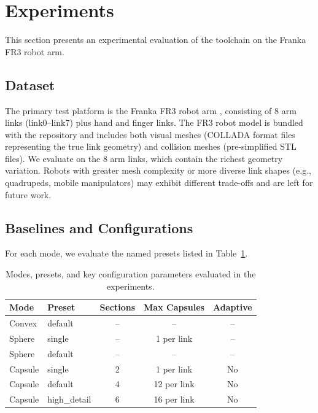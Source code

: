 \section{Experiments}
\label{sec:experiments}

This section presents an experimental evaluation of the toolchain on the Franka FR3 robot arm.

\subsection{Dataset}

The primary test platform is the Franka FR3 robot arm \cite{franka2020fr3}, consisting of 8 arm links (link0--link7) plus hand and finger links.
The FR3 robot model is bundled with the repository and includes both visual meshes (COLLADA format files representing the true link geometry) and collision meshes (pre-simplified STL files).
We evaluate on the 8 arm links, which contain the richest geometry variation.
Robots with greater mesh complexity or more diverse link shapes (e.g., quadrupeds, mobile manipulators) may exhibit different trade-offs and are left for future work.

\subsection{Baselines and Configurations}

For each mode, we evaluate the named presets listed in Table~\ref{tab:presets}.

\begin{table}[t]
\centering
\caption{Modes, presets, and key configuration parameters evaluated in the experiments.}
\label{tab:presets}
\begin{tabular}{@{}llccc@{}}
\toprule
Mode & Preset & Sections & Max Capsules & Adaptive \\
\midrule
Convex & default & -- & -- & -- \\
Sphere & single & -- & 1 per link & -- \\
Sphere & default & -- & -- & -- \\
Capsule & single & 2 & 1 per link & No \\
Capsule & default & 4 & 12 per link & No \\
Capsule & high\_detail & 6 & 16 per link & No \\
\bottomrule
\end{tabular}
\end{table}

